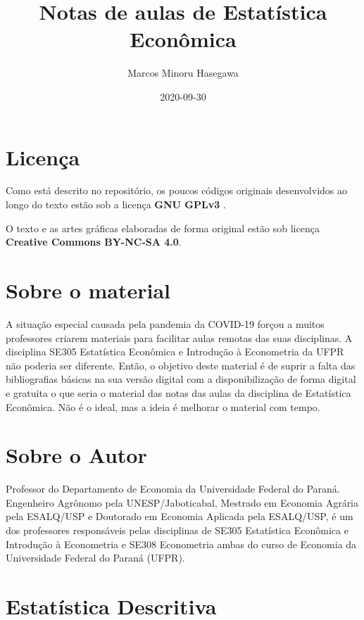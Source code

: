 \documentclass[
]{book}
\title{Notas de aulas de Estatística Econômica}
\author{Marcos Minoru Hasegawa}
\date{2020-09-30}
\begin{document}
\maketitle

{
\setcounter{tocdepth}{1}
\tableofcontents
}
\hypertarget{licenuxe7a}{%
\chapter*{Licença}\label{licenuxe7a}}

Como está descrito no repositório, os poucos códigos originais desenvolvidos ao longo do texto estão sob a licença \textbf{GNU GPLv3} .

O texto e as artes gráficas elaboradas de forma original estão sob licença \textbf{Creative Commons BY-NC-SA 4.0}.

\hypertarget{sobre-o-material}{%
\chapter*{Sobre o material}\label{sobre-o-material}}

A situação especial causada pela pandemia da COVID-19 forçou a muitos professores criarem materiais para facilitar aulas remotas das suas disciplinas. A disciplina SE305 Estatística Econômica e Introdução à Econometria da UFPR não poderia ser diferente. Então, o objetivo deste material é de suprir a falta das bibliografias básicas na sua versão digital com a disponibilização de forma digital e gratuita o que seria o material das notas das aulas da disciplina de Estatística Econômica. Não é o ideal, mas a ideia é melhorar o material com tempo.

\hypertarget{sobre-o-autor}{%
\chapter*{Sobre o Autor}\label{sobre-o-autor}}

Professor do Departamento de Economia da Universidade Federal do Paraná. Engenheiro Agrônomo pela UNESP/Jaboticabal, Mestrado em Economia Agrária pela ESALQ/USP e Doutorado em Economia Aplicada pela ESALQ/USP, é um dos professores responsáveis pelas disciplinas de SE305 Estatística Econômica e Introdução à Econometria e SE308 Econometria ambas do curso de Economia da Universidade Federal do Paraná (UFPR).

\hypertarget{estatuxedstica-descritiva}{%
\chapter{Estatística Descritiva}\label{estatuxedstica-descritiva}}
\end{document}
